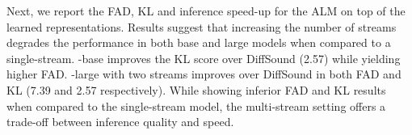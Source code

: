 Next, we report the FAD, KL and inference speed-up for the \ac{ALM} on top of the learned representations. Results suggest that increasing the number of streams degrades the performance in both base and large models when compared to a single-stream. 
\audiogen-base improves the KL score over DiffSound (2.57) while yielding higher FAD. \audiogen-large with two streams improves over DiffSound in both FAD and KL (7.39 and 2.57 respectively). While showing inferior FAD and KL results when compared to the single-stream model, the multi-stream setting offers a trade-off between inference quality and speed.

